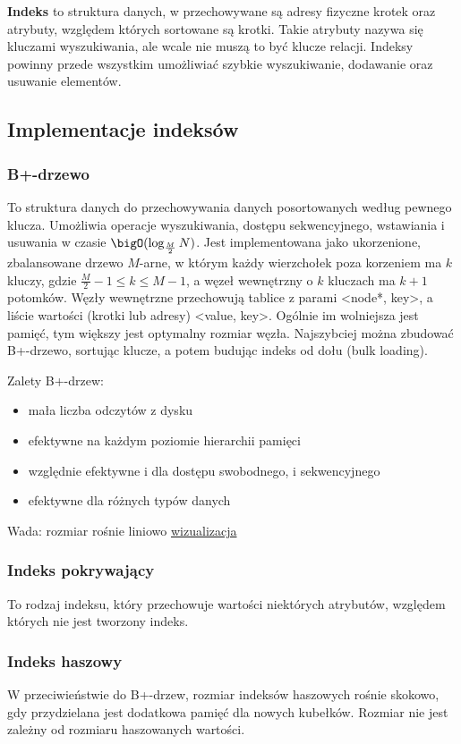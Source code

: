 \textbf{Indeks} to struktura danych, w przechowywane są adresy fizyczne krotek oraz atrybuty, względem których sortowane są krotki. Takie atrybuty nazywa się kluczami wyszukiwania, ale wcale nie muszą to być klucze relacji.
Indeksy powinny przede wszystkim umożliwiać szybkie wyszukiwanie, dodawanie oraz usuwanie elementów.

\subsection{Implementacje indeksów}
\subsubsection*{B+-drzewo}
To struktura danych do przechowywania danych posortowanych według pewnego klucza. Umożliwia operacje wyszukiwania, dostępu sekwencyjnego, wstawiania i usuwania w czasie \( \bigO(\log_{\frac{M}{2}} N) \).
Jest implementowana jako ukorzenione, zbalansowane drzewo \( M \)-arne, w którym każdy wierzchołek poza korzeniem ma \( k \) kluczy, gdzie \( \frac{M}{2} - 1 \leq k \leq M - 1 \),
a węzeł wewnętrzny o \( k \) kluczach ma \( k+1 \) potomków. Węzły wewnętrzne przechowują tablice z parami <node*, key>, a liście wartości (krotki lub adresy) <value, key>.
Ogólnie im wolniejsza jest pamięć, tym większy jest optymalny rozmiar węzła.
Najszybciej można zbudować B+-drzewo, sortując klucze, a potem budując indeks od dołu (bulk loading).

Zalety B+-drzew:
\begin{itemize}
    \item mała liczba odczytów z dysku
    \item efektywne na każdym poziomie hierarchii pamięci
    \item względnie efektywne i dla dostępu swobodnego, i sekwencyjnego
    \item efektywne dla różnych typów danych
\end{itemize}
Wada: rozmiar rośnie liniowo
\href{https://www.cs.usfca.edu/~galles/visualization/BPlusTree.html}{wizualizacja \fcTree}

\subsubsection*{Indeks pokrywający}
To rodzaj indeksu, który przechowuje wartości niektórych atrybutów, względem których nie jest tworzony indeks.

\subsubsection*{Indeks haszowy}
W przeciwieństwie do B+-drzew, rozmiar indeksów haszowych rośnie skokowo, gdy przydzielana jest dodatkowa pamięć dla nowych kubełków.
Rozmiar nie jest zależny od rozmiaru haszowanych wartości.

